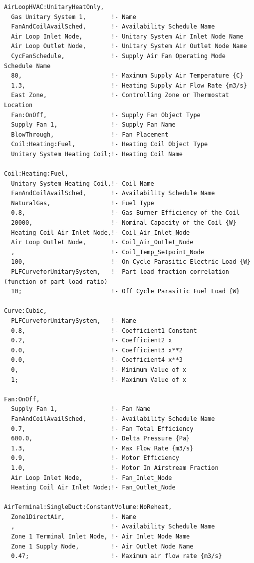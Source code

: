 \begin{lstlisting}
AirLoopHVAC:UnitaryHeatOnly,
  Gas Unitary System 1,       !- Name
  FanAndCoilAvailSched,       !- Availability Schedule Name
  Air Loop Inlet Node,        !- Unitary System Air Inlet Node Name
  Air Loop Outlet Node,       !- Unitary System Air Outlet Node Name
  CycFanSchedule,             !- Supply Air Fan Operating Mode Schedule Name
  80,                         !- Maximum Supply Air Temperature {C}
  1.3,                        !- Heating Supply Air Flow Rate {m3/s}
  East Zone,                  !- Controlling Zone or Thermostat Location
  Fan:OnOff,                  !- Supply Fan Object Type
  Supply Fan 1,               !- Supply Fan Name
  BlowThrough,                !- Fan Placement
  Coil:Heating:Fuel,          !- Heating Coil Object Type
  Unitary System Heating Coil;!- Heating Coil Name

Coil:Heating:Fuel,
  Unitary System Heating Coil,!- Coil Name
  FanAndCoilAvailSched,       !- Availability Schedule Name
  NaturalGas,                 !- Fuel Type
  0.8,                        !- Gas Burner Efficiency of the Coil
  20000,                      !- Nominal Capacity of the Coil {W}
  Heating Coil Air Inlet Node,!- Coil_Air_Inlet_Node
  Air Loop Outlet Node,       !- Coil_Air_Outlet_Node
  ,                           !- Coil_Temp_Setpoint_Node
  100,                        !- On Cycle Parasitic Electric Load {W}
  PLFCurveforUnitarySystem,   !- Part load fraction correlation (function of part load ratio)
  10;                         !- Off Cycle Parasitic Fuel Load {W}

Curve:Cubic,
  PLFCurveforUnitarySystem,   !- Name
  0.8,                        !- Coefficient1 Constant
  0.2,                        !- Coefficient2 x
  0.0,                        !- Coefficient3 x**2
  0.0,                        !- Coefficient4 x**3
  0,                          !- Minimum Value of x
  1;                          !- Maximum Value of x

Fan:OnOff,
  Supply Fan 1,               !- Fan Name
  FanAndCoilAvailSched,       !- Availability Schedule Name
  0.7,                        !- Fan Total Efficiency
  600.0,                      !- Delta Pressure {Pa}
  1.3,                        !- Max Flow Rate {m3/s}
  0.9,                        !- Motor Efficiency
  1.0,                        !- Motor In Airstream Fraction
  Air Loop Inlet Node,        !- Fan_Inlet_Node
  Heating Coil Air Inlet Node;!- Fan_Outlet_Node

AirTerminal:SingleDuct:ConstantVolume:NoReheat,
  Zone1DirectAir,             !- Name
  ,                           !- Availability Schedule Name
  Zone 1 Terminal Inlet Node, !- Air Inlet Node Name
  Zone 1 Supply Node,         !- Air Outlet Node Name
  0.47;                       !- Maximum air flow rate {m3/s}


\end{lstlisting}
